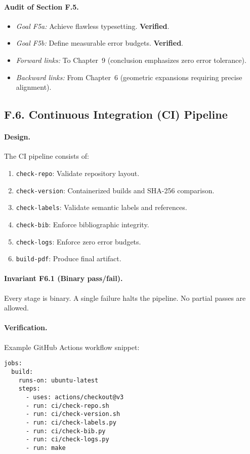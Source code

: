 \paragraph{Audit of Section F.5.}
\begin{itemize}
  \item \emph{Goal F5a:} Achieve flawless typesetting.
        \textbf{Verified}.
  \item \emph{Goal F5b:} Define measurable error budgets.
        \textbf{Verified}.
  \item \emph{Forward links:} To Chapter~9 (conclusion emphasizes zero
        error tolerance).
  \item \emph{Backward links:} From Chapter~6 (geometric expansions
        requiring precise alignment).
\end{itemize}

\subsection*{F.6. Continuous Integration (CI) Pipeline}

\paragraph{Design.}
The CI pipeline consists of:
\begin{enumerate}
  \item \texttt{check-repo}: Validate repository layout.
  \item \texttt{check-version}: Containerized builds and SHA-256
        comparison.
  \item \texttt{check-labels}: Validate semantic labels and references.
  \item \texttt{check-bib}: Enforce bibliographic integrity.
  \item \texttt{check-logs}: Enforce zero error budgets.
  \item \texttt{build-pdf}: Produce final artifact.
\end{enumerate}

\paragraph{Invariant F6.1 (Binary pass/fail).}
Every stage is binary. A single failure halts the pipeline. No partial
passes are allowed.

\paragraph{Verification.}
Example GitHub Actions workflow snippet:
\begin{verbatim}
jobs:
  build:
    runs-on: ubuntu-latest
    steps:
      - uses: actions/checkout@v3
      - run: ci/check-repo.sh
      - run: ci/check-version.sh
      - run: ci/check-labels.py
      - run: ci/check-bib.py
      - run: ci/check-logs.py
      - run: make
\end{verbatim}

